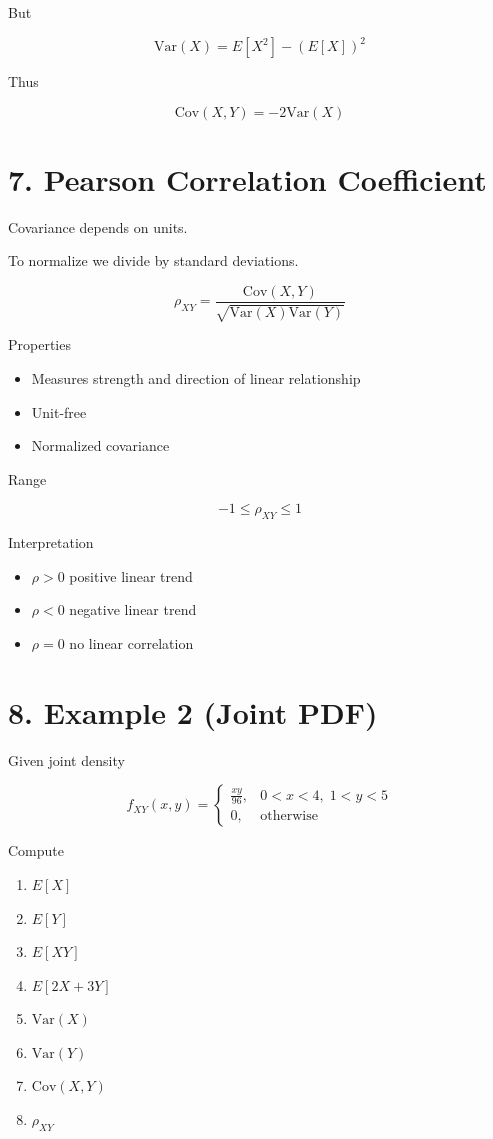 \documentclass[12pt]{article}
\begin{document}
But

\[
\text{Var}(X)=E[X^2]-(E[X])^2
\]

Thus

\[
\boxed{\text{Cov}(X,Y)=-2\text{Var}(X)}
\]

\section*{7. Pearson Correlation Coefficient}

Covariance depends on units.

To normalize we divide by standard deviations.

\[
\rho_{XY}=\frac{\text{Cov}(X,Y)}{\sqrt{\text{Var}(X)\text{Var}(Y)}}
\]

Properties

\begin{itemize}
\item Measures strength and direction of linear relationship
\item Unit-free
\item Normalized covariance
\end{itemize}

Range

\[
-1 \leq \rho_{XY} \leq 1
\]

Interpretation

\begin{itemize}
\item $\rho>0$ positive linear trend
\item $\rho<0$ negative linear trend
\item $\rho=0$ no linear correlation
\end{itemize}

\section*{8. Example 2 (Joint PDF)}

Given joint density

\[
f_{XY}(x,y)=
\begin{cases}
\frac{xy}{96}, & 0<x<4, \; 1<y<5 \\
0, & \text{otherwise}
\end{cases}
\]

Compute

\begin{enumerate}
\item $E[X]$
\item $E[Y]$
\item $E[XY]$
\item $E[2X+3Y]$
\item $\text{Var}(X)$
\item $\text{Var}(Y)$
\item $\text{Cov}(X,Y)$
\item $\rho_{XY}$
\end{enumerate}
\end{document}
